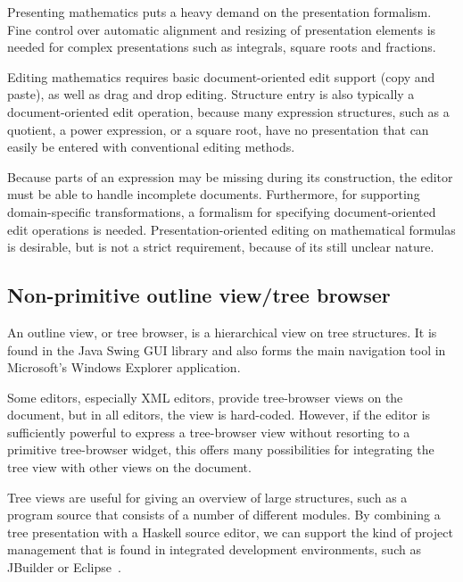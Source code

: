 
Presenting mathematics puts a heavy demand on the presentation formalism. Fine control over automatic alignment and resizing of presentation elements is needed for complex presentations such as integrals, square roots and fractions. 

Editing mathematics requires basic document-oriented edit support (copy and paste), as well as drag and drop editing. Structure entry is also typically a document-oriented edit operation, because many expression structures, such as a quotient, a power expression, or a square root, have no presentation that can easily be entered with conventional editing methods.

Because parts of an expression may be missing during its construction,  the editor must be able to handle incomplete documents. Furthermore, for supporting domain-specific transformations, a formalism for specifying document-oriented edit operations is needed. Presentation-oriented editing on mathematical formulas is desirable, but is not a strict requirement, because of its still unclear nature.

%																
\subsection{Non-primitive outline view/tree browser}\label{sect:treeBrowser}

An outline view, or tree browser, is a hierarchical view on tree structures. It is found in the Java Swing GUI library and also forms the main navigation tool in Microsoft's Windows Explorer application. 


Some editors, especially XML editors, provide tree-browser views on the document, but in all editors, the view is hard-coded. However, if the editor is sufficiently powerful to express a tree-browser view without resorting to a primitive tree-browser widget, this offers many possibilities for integrating the tree view with other views on the document. 


Tree views are useful for giving an overview of large structures, such as a program source that consists of a number of different modules. By combining a tree presentation with a Haskell source editor, we can support the kind of project management that is found in integrated development environments, such as JBuilder or Eclipse~\cite{eclipse2001}. 

